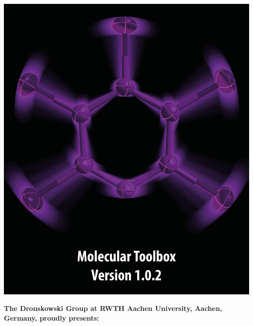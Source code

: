 \documentclass[12pt,a4paper]{article}
\begin{document}
\begin{titlepage}
\pagecolor{black}
\vspace*{\fill}
		\centering \includegraphics[width=1.0\textwidth]{Unbenannt-1-01.png}
		\vfill

\end{titlepage}
\pagecolor{white}
\vfill
\raggedright\textbf{\Large  The Dronskowski Group at RWTH Aachen University, Aachen, Germany, proudly presents:}\\
\vfill
\end{document}
